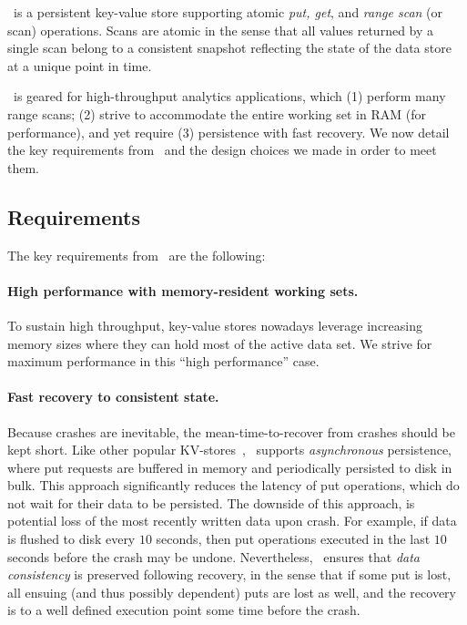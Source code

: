 

\sys\ is a persistent key-value store supporting atomic \emph{put, get}, and  \emph{range scan} (or scan) operations. 
Scans are atomic in the sense that all values returned by a single scan belong to a consistent snapshot reflecting
the state of the data store at a unique point in time.

\sys\ is geared for high-throughput analytics applications, which (1) perform many range scans; 
(2) strive to accommodate the entire working set in RAM (for performance), and yet require  (3)
persistence with fast recovery. We now detail the key requirements from \sys\ and the design choices we made in order to meet them.

\subsection{Requirements}

The key requirements from \sys\ are  the following:
\paragraph{High performance with memory-resident working sets.}
To sustain high throughput, key-value stores nowadays leverage increasing memory sizes where they can hold most of the 
active data set. We strive for maximum performance in this ``high performance'' case.  

\paragraph{Fast recovery to consistent state.}
Because crashes are inevitable, the mean-time-to-recover from crashes should be kept short.
Like other popular KV-stores~\cite{RocksDB,leveldb,hbase}, \sys\ supports \emph{asynchronous} persistence, 
where put requests are buffered in memory and periodically persisted to disk in bulk. 
This approach significantly reduces the latency of put operations, which do not wait for their data to be persisted.
The downside of this approach, is potential loss of the most recently written data upon crash. For example, 
if data is flushed to disk every $10$ seconds, then put operations executed in the last $10$ seconds before the crash 
may be undone. 
Nevertheless, \sys\ ensures that \emph{data consistency} is preserved following recovery, in the sense that 
if some put is lost, all ensuing (and thus possibly dependent) puts are lost as well, and the recovery is to a well 
defined execution point some time before the crash.
 
